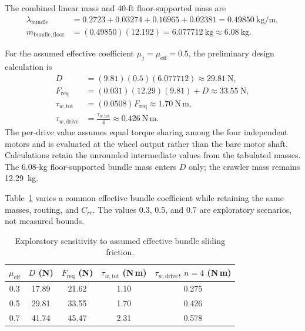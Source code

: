 \begin{samepage}
The combined linear mass and 40-ft floor-supported mass are
\begin{align}
 \lambda_{\mathrm{bundle}}&=0.2723+0.03274+0.16965+0.02381
 =0.49850~\mathrm{kg/m},\nonumber\\
 m_{\mathrm{bundle,floor}}&=(0.49850)(12.192)
 =6.077712~\mathrm{kg}\approx6.08~\mathrm{kg}.
 \label{eq:bundle-floor-mass}
\end{align}
\end{samepage}
For the assumed effective coefficient $\mu_j=\mu_{\mathrm{eff}}=0.5$, the preliminary design calculation is
\begin{align}
 D&=(9.81)(0.5)(6.077712)\approx29.81~\mathrm{N},\nonumber\\
 F_{\mathrm{req}}&=(0.031)(12.29)(9.81)+D\approx33.55~\mathrm{N},\nonumber\\
 \tau_{w,\mathrm{tot}}&=(0.0508)F_{\mathrm{req}}\approx1.70~\mathrm{N\,m},\nonumber\\
 \tau_{w,\mathrm{drive}}&=\frac{\tau_{w,\mathrm{tot}}}{4}
 \approx0.426~\mathrm{N\,m}.
 \label{eq:bundle-baseline-demand}
\end{align}
The per-drive value assumes equal torque sharing among the four independent motors and is evaluated at the wheel output rather than the bare motor shaft. Calculations retain the unrounded intermediate values from the tabulated masses. The 6.08-kg floor-supported bundle mass enters $D$ only; the crawler mass remains 12.29~kg.

Table~\ref{tab:bundle-friction-sensitivity} varies a common effective bundle coefficient while retaining the same masses, routing, and $C_{rr}$. The values 0.3, 0.5, and 0.7 are exploratory scenarios, not measured bounds.
\begin{table}[htbp]
\centering
\caption{Exploratory sensitivity to assumed effective bundle sliding friction.}
\label{tab:bundle-friction-sensitivity}
\begingroup\small\singlespacing
\renewcommand{\arraystretch}{1.2}
\begin{tabular}{@{}ccccc@{}}
\toprule
$\mu_{\mathrm{eff}}$ & $D$ (N) & $F_{\mathrm{req}}$ (N) &
$\tau_{w,\mathrm{tot}}$ (N\,m) & $\tau_{w,\mathrm{drive}}$, $n=4$ (N\,m) \\
\midrule
0.3 & 17.89 & 21.62 & 1.10 & 0.275 \\
0.5 & 29.81 & 33.55 & 1.70 & 0.426 \\
0.7 & 41.74 & 45.47 & 2.31 & 0.578 \\
\bottomrule
\end{tabular}
\endgroup
\end{table}

